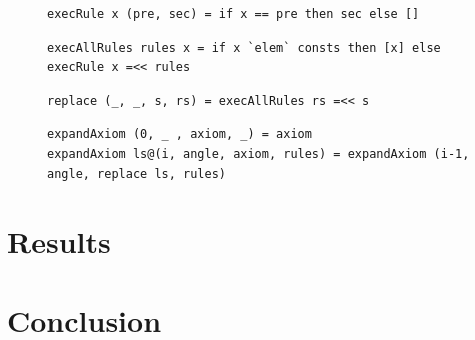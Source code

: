 \documentclass{article}
\begin{document}
\begin{figure}[!h]
\centering
\begin{lstlisting}[style=BashStyle]
execRule x (pre, sec) = if x == pre then sec else []
\end{lstlisting}
\begin{lstlisting}[style=BashStyle]
execAllRules rules x = if x `elem` consts then [x] else execRule x =<< rules
\end{lstlisting}
\begin{lstlisting}[style=BashStyle]
replace (_, _, s, rs) = execAllRules rs =<< s
\end{lstlisting}
\begin{lstlisting}[style=BashStyle]
expandAxiom (0, _ , axiom, _) = axiom
expandAxiom ls@(i, angle, axiom, rules) = expandAxiom (i-1, angle, replace ls, rules)
\end{lstlisting}
\vskip -6pt
\end{figure}

\section{Results}
\label{results}


\section{Conclusion}
\label{conclusion}
\end{document}
